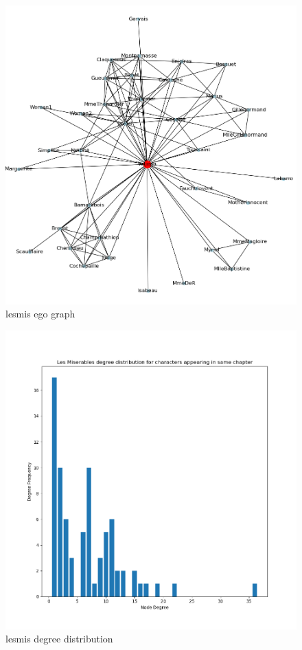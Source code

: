 \documentclass[a4paper]{article}
\begin{document}
\begin{enumerate}[label={(1.\alph*):}]
        \begin{figure}
            \includegraphics[width=\linewidth]{./LesMis_ego_vis.png}
            \caption{lesmis ego graph}
            \label{fig:lesmis_gr}
        \end{figure}
        
        \begin{figure}
            \includegraphics[width=\linewidth]{./LesMis_degree_dist.png}
            \caption{lesmis degree distribution}
            \label{fig:lesmis_deg}
        \end{figure}


\end{enumerate}
\end{document}
